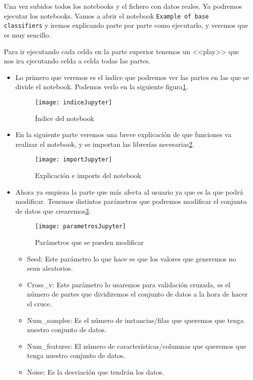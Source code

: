 Una vez subidos todos los notebooks y el fichero con datos reales. Ya podremos ejecutar los notebooks. Vamos a abrir el notebook \texttt{Example of base classifiers} y iremos explicando parte por parte como ejecutarlo, y veremos que es muy sencillo.

Para ir ejecutando cada celda en la parte superior tenemos un <<play>> que nos ira ejecutando celda a celda todas las partes.
\begin{itemize}
	\item Lo primero que veremos es el índice que podremos ver las partes en las que se divide el notebook. Podemos verlo en la siguiente figura\ref{fig:indiceJupyter}.
	\begin{figure}
	\centering
	\texttt{[image: indiceJupyter]}
	\caption{Índice del notebook}
	\label{fig:indiceJupyter}
	\end{figure}
	\item En la siguiente parte veremos una breve explicación de que funciones va realizar el notebook, y se importan las librerías necesarias\ref{fig:importJupyter}.
	\begin{figure}
	\centering
	\texttt{[image: importJupyter]}
	\caption{Explicación e imports del notebook}
	\label{fig:importJupyter}
	\end{figure}
	\item Ahora ya empieza la parte que más afecta al usuario ya que es la que podrá modificar. Tenemos distintos parámetros que podremos modificar el conjunto de datos que crearemos\ref{fig:parametrosJupyter}.
	\begin{figure}
	\centering
	\texttt{[image: parametrosJupyter]}
	\caption{Parámetros que se pueden modificar}
	\label{fig:parametrosJupyter}
	\end{figure}
	\begin{itemize}
		\item Seed: Este parámetro lo que hace es que los valores que generemos no sean aleatorios.
		\item Cross\_v: Este parámetro lo usaremos para validación cruzada, es el número de partes que dividiremos el conjunto de datos a la hora de hacer el cruce.
		\item Num\_samples: Es el número de instancias/filas que queremos que tenga nuestro conjunto de datos.
		\item Num\_features: El número de características/columnas que queremos que tenga nuestro conjunto de datos.
		\item Noise: Es la desviación que tendrán los datos.

\end{itemize}
\end{itemize}
